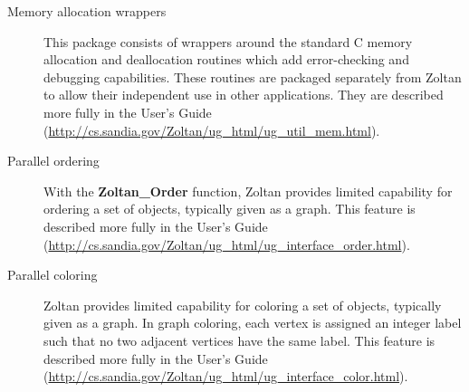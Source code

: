 \begin{description}
\item [Memory allocation wrappers]
This package consists of wrappers around the standard C memory allocation and 
deallocation routines which add error-checking and debugging capabilities. These 
routines are packaged separately from Zoltan to allow their independent use in other 
applications. 
They are described more fully in the User's Guide
(\url{http://cs.sandia.gov/Zoltan/ug\_html/ug\_util\_mem.html}).

\item [Parallel ordering]
With the \textbf{Zoltan\_Order} function,
Zoltan provides limited capability for ordering a set of objects, typically 
given as a graph.
This feature is described more fully in the User's Guide
(\url{http://cs.sandia.gov/Zoltan/ug\_html/ug\_interface\_order.html}).

\item [Parallel coloring]
Zoltan provides limited capability for coloring a set of objects, typically given 
as a graph. In graph coloring, each vertex is assigned an integer label such 
that no two adjacent vertices have the same label. 
This feature is described more fully in the User's Guide
(\url{http://cs.sandia.gov/Zoltan/ug\_html/ug\_interface\_color.html}).
\end{description}
